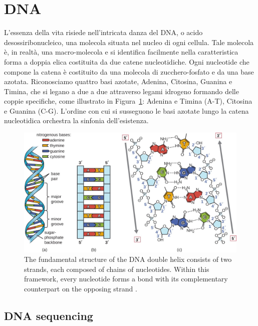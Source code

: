 \section{DNA}
\label{sec:dna}

L'essenza della vita risiede nell'intricata danza del DNA, o acido desossiribonucleico, una molecola situata nel nucleo di ogni cellula. Tale molecola è, in realtà, una macro-molecola e si identifica facilmente nella caratteristica forma a doppia elica costituita da due catene nucleotidiche. Ogni nucleotide che compone la catena è costituito da una molecola di zucchero-fosfato e da una base azotata. Riconosciamo quattro basi azotate, Adenina, Citosina, Guanina e Timina, che si legano a due a due attraverso legami idrogeno formando delle coppie specifiche, come illustrato in Figura~\ref{fig:DNA-double-helix-structure}: Adenina e Timina (A-T), Citosina e Guanina (C-G). L'ordine con cui si susseguono le basi azotate lungo la catena nucleotidica orchestra la sinfonia dell'esistenza.

\begin{figure}[!ht]
	\centering
	\includegraphics[width=0.85\linewidth]{images/dna-structure}
	\caption{The fundamental structure of the \acs{DNA} double helix consists of two strands, each composed of chains of nucleotides. Within this framework, every nucleotide forms a bond with its complementary counterpart on the opposing strand \cite{openstax_microbiology_2016}.}
	\label{fig:DNA-double-helix-structure}
\end{figure}




\subsection{DNA sequencing}
\label{subsec:dna-sequencing}

